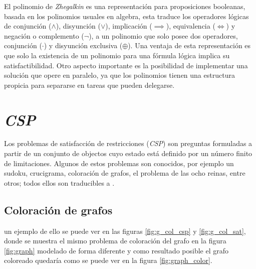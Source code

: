 El polinomio de \textit{Zhegalkin} es una representación para proposiciones booleanas, basada en los polinomios usuales en algebra, esta traduce los operadores lógicas de conjunción ($\land$), disyunción ($\lor$), implicación ($\implies$), equivalencia ($\iff$) y negación o complemento ($\neg$), a un polinomio que solo posee dos operadores, conjunción ($\cdot$) y disyunción exclusiva ($\oplus$). Una ventaja de esta representación es que solo la existencia de un polinomio para una fórmula lógica implica su satisfactibilidad. Otro aspecto importante es la posibilidad de implementar una solución que opere en paralelo, ya que los polinomios tienen una estructura propicia para separarse en tareas que pueden delegarse.

\section{\textit{CSP}}

Los problemas de satisfacción de restricciones (\textit{CSP}) son preguntas formuladas a partir de un conjunto de objectos cuyo estado está definido por un número finito de limitaciones. Algunos de estos problemas son conocidos, por ejemplo un sudoku, crucigrama, coloración de grafos, el problema de las ocho reinas, entre otros; todos ellos son traducibles a \sat.


\subsection{Coloración de grafos}

un ejemplo de ello se puede ver en las figuras \ref{fig:g_col_csp} y \ref{fig:g_col_sat}, donde se muestra el mismo problema de coloración del grafo en la figura \ref{fig:graph} modelado de forma diferente y como resultado posible el grafo coloreado quedaría como se puede ver en la figura \ref{fig:graph_color}.

